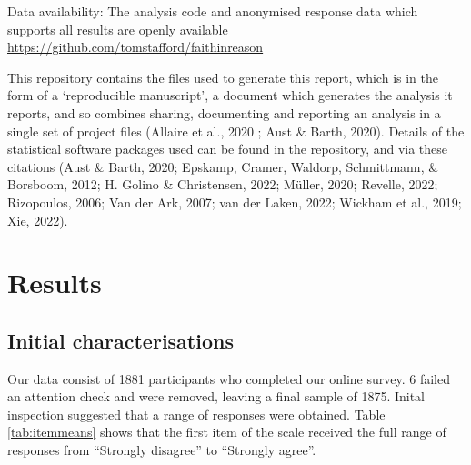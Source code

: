 \documentclass[
  ,jou,floatsintext]{apa6}
\begin{document}
Data availability: The analysis code and anonymised response data which supports all results are openly available \url{https://github.com/tomstafford/faithinreason}

This repository contains the files used to generate this report, which is in the form of a `reproducible manuscript', a document which generates the analysis it reports, and so combines sharing, documenting and reporting an analysis in a single set of project files (Allaire et al., 2020 ; Aust \& Barth, 2020). Details of the statistical software packages used can be found in the repository, and via these citations (Aust \& Barth, 2020; Epskamp, Cramer, Waldorp, Schmittmann, \& Borsboom, 2012; H. Golino \& Christensen, 2022; Müller, 2020; Revelle, 2022; Rizopoulos, 2006; Van der Ark, 2007; van der Laken, 2022; Wickham et al., 2019; Xie, 2022).

\hypertarget{results}{%
\section{Results}\label{results}}

\hypertarget{initial-characterisations}{%
\subsection{Initial characterisations}\label{initial-characterisations}}

Our data consist of 1881 participants who completed our online survey. 6 failed an attention check and were removed, leaving a final sample of 1875. Inital inspection suggested that a range of responses were obtained. Table \ref{tab:itemmeans} shows that the first item of the scale received the full range of responses from ``Strongly disagree'' to ``Strongly agree''.
\end{document}
